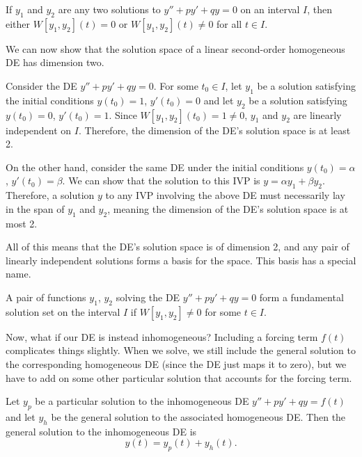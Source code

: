 \documentclass[../m82main.tex]{subfiles}
\begin{document}
\begin{corollary}[$W(t_0) = 0$ implies identially zero]
    If $y_1$ and $y_2$ are any two solutions to $y'' + py' + qy = 0$ on an interval $I$, then either $W[y_1, y_2](t) = 0$ or $W[y_1, y_2](t) \neq 0$ for all $t \in I$.
\end{corollary}

We can now show that the solution space of a linear second-order homogeneous DE has dimension two.

Consider the DE $y'' + py' + qy = 0$.
For some $t_0 \in I$, let $y_1$ be a solution satisfying the initial conditions $y(t_0) = 1$, $y'(t_0) = 0$ and let $y_2$ be a solution satisfying $y(t_0) = 0$, $y'(t_0) = 1$.
Since $W[y_1, y_2](t_0) = 1 \neq 0$, $y_1$ and $y_2$ are linearly independent on $I$.
Therefore, the dimension of the DE's solution space is at least 2.

On the other hand, consider the same DE under the initial conditions $y(t_0) = \alpha$, $y'(t_0) = \beta$.
We can show that the solution to this IVP is $y = \alpha y_1 + \beta y_2$.
Therefore, a solution $y$ to any IVP involving the above DE must necessarily lay in the span of $y_1$ and $y_2$, meaning the dimension of the DE's solution space is at most 2.

All of this means that the DE's solution space is of dimension 2, and any pair of linearly independent solutions forms a basis for the space.
This basis has a special name.

\begin{definition}
    A pair of functions $y_1$, $y_2$ solving the DE $y'' + py' + qy = 0$ form a fundamental solution set on the interval $I$ if $W[y_1, y_2] \neq 0$ for some $t \in I$.
\end{definition}

Now, what if our DE is instead inhomogeneous?
Including a forcing term $f(t)$ complicates things slightly.
When we solve, we still include the general solution to the corresponding homogeneous DE (since the DE just maps it to zero), but we have to add on some other particular solution that accounts for the forcing term.

\begin{theorem}
    Let $y_p$ be a particular solution to the inhomogeneous DE $y'' + py' + qy = f(t)$ and let $y_h$ be the general solution to the associated homogeneous DE.
    Then the general solution to the inhomogeneous DE is
    \[ y(t) = y_p(t) + y_h(t). \]
\end{theorem}
\end{document}
